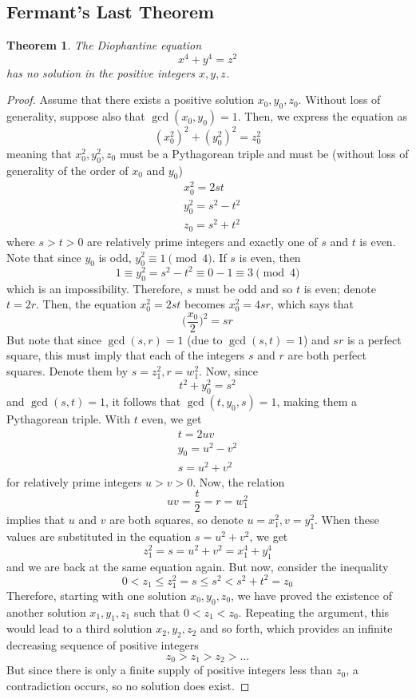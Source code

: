 \documentclass{article}
\newtheorem{theorem}{Theorem}[section]
\theoremstyle{remark}
\theoremstyle{definition}
\begin{document}
\subsection{Fermant's Last Theorem}
\begin{theorem}
The Diophantine equation 
\[x^4 + y^4 = z^2\]
has no solution in the positive integers $x, y, z$. 
\end{theorem}
\begin{proof}
Assume that there exists a positive solution $x_0, y_0, z_0$. Without loss of generality, suppose also that $\gcd(x_0, y_0) = 1$. Then, we express the equation as
\[(x_0^2)^2 +(y_0^2)^2 = z_0^2\]
meaning that $x_0^2, y_0^2, z_0$ must be a Pythagorean triple and must be (without loss of generality of the order of $x_0$ and $y_0$)
\begin{align*}
    & x_0^2 = 2st \\
    & y_0^2 = s^2 - t^2 \\
    & z_0 = s^2 + t^2
\end{align*}
where $s > t > 0$ are relatively prime integers and exactly one of $s$ and $t$ is even. Note that since $y_0$ is odd, $y_0^2 \equiv 1 \pmod{4}$. If $s$ is even, then 
\[1 \equiv y_0^2 = s^2 - t^2 \equiv 0 - 1 \equiv 3 \pmod{4}\]
which is an impossibility. Therefore, $s$ must be odd and so $t$ is even; denote $t = 2r$. Then, the equation $x_0^2 = 2st$ becomes $x_0^2 = 4sr$, which says that
\[\bigg(\frac{x_0}{2} \bigg)^2 = sr\]
But note that since $\gcd(s, r) = 1$ (due to $\gcd(s, t) = 1$) and $sr$ is a perfect square, this must imply that each of the integers $s$ and $r$ are both perfect squares. Denote them by $s = z_1^2, r = w_1^2$. Now, since 
\[t^2 + y_0^2 = s^2\]
and $\gcd(s, t) = 1$, it follows that $\gcd(t, y_0, s) = 1$, making them a Pythagorean triple. With $t$ even, we get
\begin{align*}
    t = 2 uv \\
    y_0 = u^2 - v^2 \\
    s = u^2 + v^2
\end{align*}
for relatively prime integers $u>v>0$. Now, the relation 
\[uv = \frac{t}{2} = r = w_1^2\]
implies that $u$ and $v$ are both squares, so denote $u = x_1^2, v = y_1^2$. When these values are substituted in the equation $s = u^2 + v^2$, we get 
\[z_1^2 = s = u^2 + v^2 = x_1^4 + y_1^4\]
and we are back at the same equation again. But now, consider the inequality
\[0<z_1 \leq z_1^2 = s \leq s^2 < s^2 + t^2 = z_0\]
Therefore, starting with one solution $x_0, y_0, z_0$, we have proved the existence of another solution $x_1, y_1, z_1$ such that $0<z_1 < z_0$. Repeating the argument, this would lead to a third solution $x_2, y_2, z_2$ and so forth, which provides an infinite decreasing sequence of positive integers
\[z_0 > z_1 > z_2 > ...\]
But since there is only a finite supply of positive integers less than $z_0$, a contradiction occurs, so no solution does exist.   
\end{proof}
\end{document}
